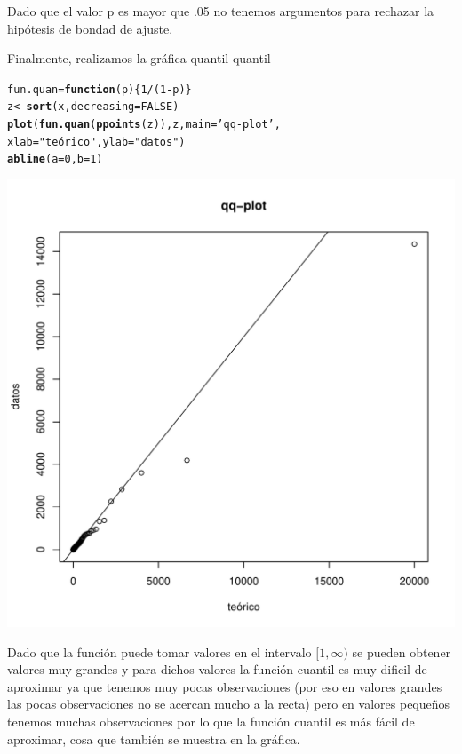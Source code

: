 \documentclass[12 pt]{article}\usepackage[]{graphicx}\usepackage[]{color}
\makeatletter
\def\maxwidth{ %
  \ifdim\Gin@nat@width>\linewidth
    \linewidth
  \else
    \Gin@nat@width
  \fi
}
\newcommand{\hlnum}[1]{\textcolor[rgb]{0.686,0.059,0.569}{#1}}%
\newcommand{\hlstr}[1]{\textcolor[rgb]{0.192,0.494,0.8}{#1}}%
\newcommand{\hlopt}[1]{\textcolor[rgb]{0,0,0}{#1}}%
\newcommand{\hlstd}[1]{\textcolor[rgb]{0.345,0.345,0.345}{#1}}%
\newcommand{\hlkwa}[1]{\textcolor[rgb]{0.161,0.373,0.58}{\textbf{#1}}}%
\newcommand{\hlkwb}[1]{\textcolor[rgb]{0.69,0.353,0.396}{#1}}%
\newcommand{\hlkwc}[1]{\textcolor[rgb]{0.333,0.667,0.333}{#1}}%
\newcommand{\hlkwd}[1]{\textcolor[rgb]{0.737,0.353,0.396}{\textbf{#1}}}%
\newenvironment{kframe}{%
 \def\at@end@of@kframe{}%
 \ifinner\ifhmode%
  \def\at@end@of@kframe{\end{minipage}}%
  \begin{minipage}{\columnwidth}%
 \fi\fi%
 \def\FrameCommand##1{\hskip\@totalleftmargin \hskip-\fboxsep
 \colorbox{shadecolor}{##1}\hskip-\fboxsep
     \hskip-\linewidth \hskip-\@totalleftmargin \hskip\columnwidth}%
 \MakeFramed {\advance\hsize-\width
   \@totalleftmargin\z@ \linewidth\hsize
   \@setminipage}}%
 {\par\unskip\endMakeFramed%
 \at@end@of@kframe}
\newenvironment{knitrout}{}{} %
\makeatother
\begin{document}
\begin{enumerate}
Dado que el valor p es mayor que .05 no tenemos argumentos para rechazar la hipótesis de bondad de ajuste.

Finalmente, realizamos la gráfica quantil-quantil

\begin{knitrout}
\color{fgcolor}\begin{kframe}
\begin{alltt}
    \hlstd{fun.quan} \hlkwb{=} \hlkwa{function}\hlstd{(}\hlkwc{p}\hlstd{)\{}\hlnum{1}\hlopt{/}\hlstd{(}\hlnum{1}\hlopt{-}\hlstd{p)\}}
    \hlstd{z} \hlkwb{<-} \hlkwd{sort}\hlstd{(x,}\hlkwc{decreasing}\hlstd{=}\hlnum{FALSE}\hlstd{)}
    \hlkwd{plot}\hlstd{(}\hlkwd{fun.quan}\hlstd{(}\hlkwd{ppoints}\hlstd{(z)), z,} \hlkwc{main}\hlstd{=}\hlstr{'qq-plot'}\hlstd{,}
    \hlkwc{xlab} \hlstd{=} \hlstr{"teórico"} \hlstd{,} \hlkwc{ylab} \hlstd{=} \hlstr{"datos"}\hlstd{)}
    \hlkwd{abline}\hlstd{(}\hlkwc{a}\hlstd{=}\hlnum{0}\hlstd{,}\hlkwc{b}\hlstd{=}\hlnum{1}\hlstd{)}
\end{alltt}
\end{kframe}
\includegraphics[width=\maxwidth]{figure/unnamed-chunk-20-1} 

\end{knitrout}

Dado que la función puede tomar valores en el intervalo $[1,\infty)$ se pueden obtener valores muy grandes y para dichos valores la función cuantil es muy dificil de aproximar ya que tenemos muy pocas observaciones (por eso en valores grandes las pocas observaciones no se acercan mucho a la recta) pero en valores pequeños tenemos muchas observaciones por lo que la función cuantil es más fácil de aproximar, cosa que también se muestra en la gráfica.







\end{enumerate}
\end{document}
